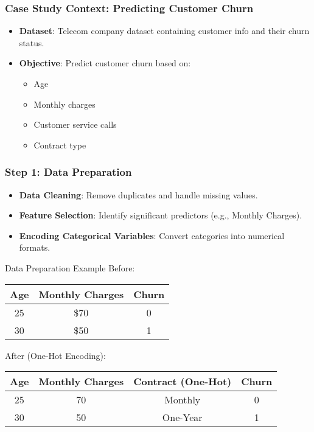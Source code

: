 \documentclass[aspectratio=169]{beamer}
\begin{document}
\begin{frame}
    \frametitle{Case Study Context: Predicting Customer Churn}
    \begin{itemize}
        \item \textbf{Dataset}: Telecom company dataset containing customer info and their churn status.
        \item \textbf{Objective}: Predict customer churn based on:
        \begin{itemize}
            \item Age
            \item Monthly charges
            \item Customer service calls
            \item Contract type
        \end{itemize}
    \end{itemize}
\end{frame}

\begin{frame}
    \frametitle{Step 1: Data Preparation}
    \begin{itemize}
        \item \textbf{Data Cleaning}: Remove duplicates and handle missing values.
        \item \textbf{Feature Selection}: Identify significant predictors (e.g., Monthly Charges).
        \item \textbf{Encoding Categorical Variables}: Convert categories into numerical formats.
    \end{itemize}

    \begin{block}{Data Preparation Example}
    Before:
    \begin{tabular}{|c|c|c|}
        \hline
        Age & Monthly Charges & Churn \\
        \hline
        25  & \$70            & 0     \\
        30  & \$50            & 1     \\
        \hline
    \end{tabular}

    After (One-Hot Encoding):
    \begin{tabular}{|c|c|c|c|}
        \hline
        Age & Monthly Charges & Contract (One-Hot) & Churn \\
        \hline
        25  & 70             & Monthly            & 0     \\
        30  & 50             & One-Year           & 1     \\
        \hline
    \end{tabular}
    \end{block}
\end{frame}
\end{document}
